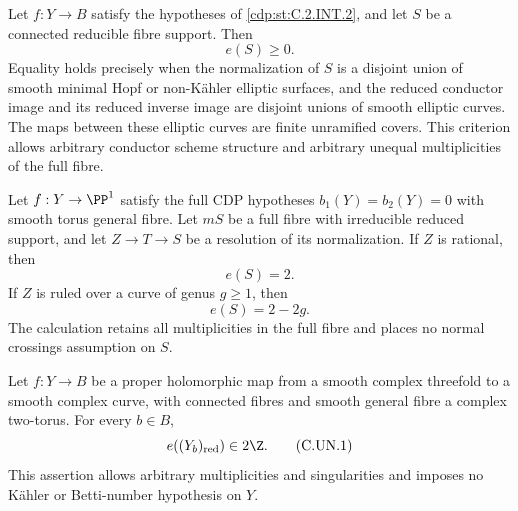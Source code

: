 \begin{proposition}\label{cdp:st:C.2.INT.3}


Let $f:Y\to B$ satisfy the hypotheses of \ref{cdp:st:C.2.INT.2},
and let $S$ be a connected reducible fibre support.
Then
\[
 e(S)\ge0.
 \tag{C.INT.15}\label{cdp:eq:C.INT.15}
\]
Equality holds precisely when the normalization of $S$
is a disjoint union of smooth minimal Hopf or
non-K\"ahler elliptic surfaces, and the reduced
conductor image and its reduced inverse image are
disjoint unions of smooth elliptic curves. The maps
between these elliptic curves are finite unramified
covers. This criterion allows arbitrary conductor
scheme structure and arbitrary unequal multiplicities
of the full fibre.
\end{proposition}

\begin{proposition}\label{cdp:st:C.2.MH.2}

Let $f:Y\to\PP^1$ satisfy the full CDP hypotheses
$b_1(Y)=b_2(Y)=0$ with smooth torus general fibre.
Let $mS$ be a full fibre with irreducible reduced support,
and let $Z\to T\to S$ be a resolution of its
normalization. If $Z$ is rational, then
\[
                              e(S)=2.
 \tag{C.MH.6}\label{cdp:eq:C.MH.6}
\]
If $Z$ is ruled over a curve of genus $g\ge1$, then
\[
                              e(S)=2-2g.
 \tag{C.MH.7}\label{cdp:eq:C.MH.7}
\]
The calculation retains all multiplicities in the full
fibre and places no normal crossings assumption on $S$.
\end{proposition}

\begin{proposition}\label{cdp:st:C.2.UN.1}

Let $f:Y\to B$ be a proper holomorphic map from a smooth complex
threefold to a smooth complex curve, with connected fibres and smooth
general fibre a complex two-torus. For every $b\in B$,
\[
                    e((Y_b)_{\rm red})\in2\Z.       \tag{C.UN.1}\label{cdp:eq:C.UN.1}
\]
This assertion allows arbitrary multiplicities and singularities and
imposes no K\"ahler or Betti-number hypothesis on $Y$.
\end{proposition}

